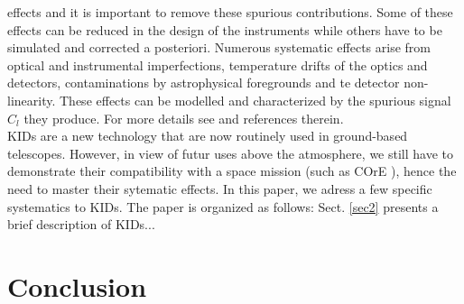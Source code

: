 \documentclass[twocolumn, traditabstract]{aa}
\begin{document}
effects and it is important to remove these spurious contributions. Some of
these effects can be reduced in the design of the instruments while others have
to be simulated and corrected a posteriori. Numerous systematic effects arise
from optical and instrumental imperfections, temperature drifts of the optics
and detectors, contaminations by astrophysical foregrounds and te detector
non-linearity. These effects can be modelled and characterized by the spurious
signal $C_{l}$ they produce. For more details see \citep{2008PhRvD..77h3003S,
  quickpol} and references therein.\\ KIDs are a new technology that are now
routinely used in ground-based telescopes. However, in view of futur
uses above the atmosphere, we still have to demonstrate their
compatibility with a space mission (such as COrE \citep{2016arXiv160907263D}),
hence the need to master their sytematic effects. In this paper, we adress a few
specific systematics to KIDs. The paper is organized as follows:
Sect. \ref{sec2} presents a brief description of KIDs...





\section{Conclusion}
\label{conclusion}
\end{document}
